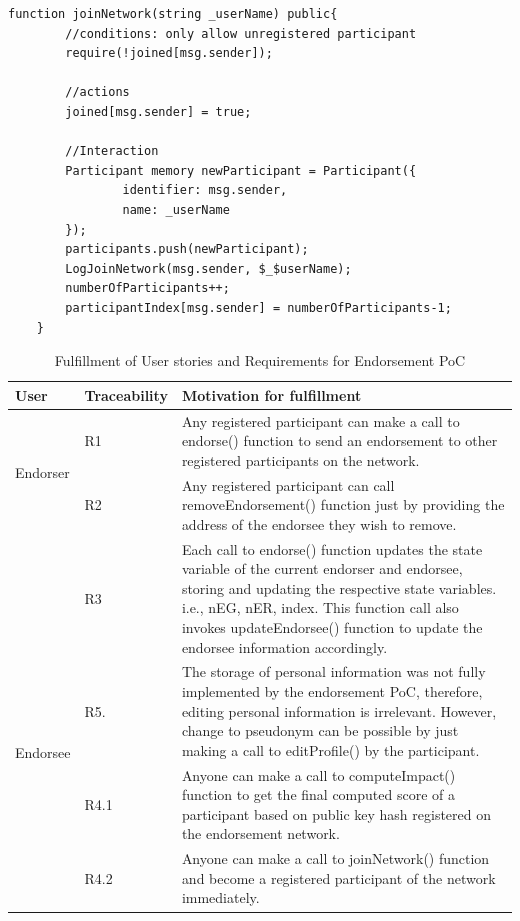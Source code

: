 \begin{lstlisting}[language=Solidity]
	function joinNetwork(string _userName) public{
		//conditions: only allow unregistered participant
		require(!joined[msg.sender]);

		//actions
		joined[msg.sender] = true;
		
        //Interaction
		Participant memory newParticipant = Participant({
				identifier: msg.sender,
				name: _userName
        });
		participants.push(newParticipant);
        LogJoinNetwork(msg.sender, $_$userName);
        numberOfParticipants++;
        participantIndex[msg.sender] = numberOfParticipants-1;
    }
\end{lstlisting}

\begin{center} \label{table:fulfillment} 
	\begin{table}
		\begin{tabular} {| l | l | p{9cm} | }
		\hline
		\textbf{User}  & \textbf{Traceability}   & \textbf{Motivation for fulfillment} \\
		\hline
		\multirow{2}{*}{Endorser} & R1 & Any registered participant can make a
		call to endorse() function to send an endorsement to other registered
		participants on the network.      
		\\\cline{2-3} 
		& R2  & Any registered participant can call removeEndorsement()
		function just by providing the address of the endorsee they wish to
		remove.  \\\cline{2-3}
		& R3 & Each call to endorse() function updates the state variable of
		the current endorser and endorsee, storing and updating the respective
		state variables. i.e., nEG, nER, index. This function call also invokes
		updateEndorsee() function to update the endorsee information
		accordingly.  \\\cline{2-3}
		\hline
		\multirow{2}{*}{Endorsee} & R5.& The storage of personal information
		was not fully implemented by the endorsement PoC, therefore, editing
		personal information is irrelevant. However, change to pseudonym can be
		possible by just making a call to editProfile() by the participant.
		\\\cline{2-3}
		\hline
		\multirow{2}{*}{other users} & R4.1 & Anyone can make a call to
		computeImpact() function to get the final computed score of a
		participant based on public key hash registered on the endorsement
		network. \\\cline{2-3}
		& R4.2 &  Anyone can make a call to joinNetwork() function and become a
		registered participant of the network immediately.  \\\cline{2-3}
		\hline
	\end{tabular}
	\caption{Fulfillment of User stories and Requirements for Endorsement PoC}
\end{table}
\end{center}

